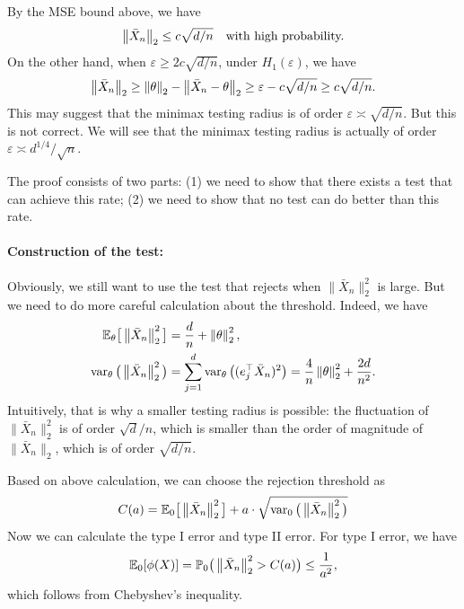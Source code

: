 \documentclass[11pt,letterpaper]{article}
\numberwithin{theorem}{lecture}
\numberwithin{proposition}{lecture}
\numberwithin{lemma}{lecture}
\numberwithin{claim}{lecture}
\numberwithin{corollary}{lecture}
\numberwithin{definition}{lecture}
\numberwithin{conjecture}{lecture}
\numberwithin{remark}{lecture}
\numberwithin{example}{lecture}
\numberwithin{equation}{lecture}
\begin{document}
By the MSE bound above, we have
\begin{align*}
  \left\| \bar{X}_n\right\|_{2} \leq c \sqrt{d/n} \quad \text{with high probability.}
\end{align*}
On the other hand, when $\varepsilon \geq 2 c \sqrt{d/n}$, under $H_1 (\varepsilon)$, we have
\begin{align*}
    \left\| \bar{X}_n\right\|_{2} \geq \left\| \theta\right\|_{2} - \left\| \bar{X}_n - \theta\right\|_{2} \geq \varepsilon - c \sqrt{d/n} \geq c \sqrt{d/n}.
\end{align*}
This may suggest that the minimax testing radius is of order $\varepsilon \asymp \sqrt{d/n}$. But this is not correct. We will see that the minimax testing radius is actually of order $\varepsilon \asymp d^{1/4} / \sqrt{n}$.

The proof consists of two parts: (1) we need to show that there exists a test that can achieve this rate; (2) we need to show that no test can do better than this rate.

\paragraph{Construction of the test:} Obviously, we still want to use the test that rejects when $\|\bar{X}_n\|_2^2$ is large. But we need to do more careful calculation about the threshold. Indeed, we have
\begin{align*}
  {\mathbb{E}}_{\theta} \big[ \left\| \bar{X}_n\right\|_{2}^2 \big] &= \frac{d}{n} + \left\| \theta\right\|_{2}^2,\\
  \operatorname{var}_\theta \big( \left\| \bar{X}_n\right\|_{2}^2 \big) &=  \sum_{j = 1}^d \operatorname{var}_\theta \big( (e_j^\top \bar{X}_{n})^2 \big) = \frac{4}{n} \left\| \theta\right\|_{2}^2 + \frac{2d}{n^2}.
\end{align*}
Intuitively, that is why a smaller testing radius is possible: the fluctuation of $\|\bar{X}_n\|_2^2$ is of order $\sqrt{d}/n$, which is smaller than the order of magnitude of $\| \bar{X}_n \|_2$, which is of order $\sqrt{d/n}$.

Based on above calculation, we can choose the rejection threshold as
\begin{align*}
  C (a) = {\mathbb{E}}_0 \big[ \left\| \bar{X}_n\right\|_{2}^2 \big] + a \cdot \sqrt{ \operatorname{var}_0 \big( \left\| \bar{X}_n\right\|_{2}^2 \big)}
\end{align*}
Now we can calculate the type I error and type II error. For type I error, we have
\begin{align*}
  {\mathbb{E}}_0 [\phi (X)] = {\mathbb{P}}_0 \big( \left\| \bar{X}_n\right\|_{2}^2 > C (a) \big) \leq \frac{1}{a^2},
\end{align*}
which follows from Chebyshev's inequality.
\end{document}
